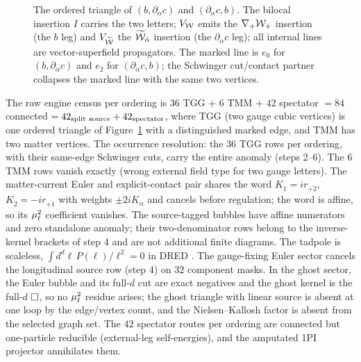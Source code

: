 \begin{figure}[t]
\centering
{}
\caption{The ordered triangle of $(b,\partial_{\dot\alpha}c)$ and
$(\partial_{\dot\alpha}c,b)$. The bilocal insertion $I$ carries the two
letters; $V_{\mathcal{W}}$ emits the $\nabla_{+}\mathcal{W}_{+}$ insertion (the $b$ leg) and
$V_{\widetilde{\mathcal{W}}}$ the $\widetilde{\mathcal{W}}_{\dot\alpha}$ insertion (the
$\partial_{\dot\alpha}c$ leg); all internal lines are vector-superfield
propagators. The marked line is $e_{0}$ for $(b,\partial_{\dot\alpha}c)$ and
$e_{2}$ for $(\partial_{\dot\alpha}c,b)$; the Schwinger cut/contact partner
collapses the marked line with the same two vertices.}
\label{fig:ss:ad-triangle}
\end{figure}

The raw engine census per ordering is $36$ TGG $+$ $6$ TMM $+$ $42$ spectator
$=84$ connected $=42_{\rm split\ source}+42_{\rm spectator}$, where TGG (two
gauge cubic vertices) is one ordered triangle of
Figure~\ref{fig:ss:ad-triangle} with a distinguished marked edge, and TMM has
two matter vertices. The occurrence resolution: the $36$ TGG rows per
ordering, with their same-edge Schwinger cuts, carry the entire anomaly (steps
2--6). The $6$ TMM rows vanish exactly (wrong external field type for two
gauge letters). The matter-current Euler and explicit-contact pair shares the
word $K_{\dot1}=ir_{+\dot2}$, $K_{\dot2}=-ir_{+\dot1}$ with weights
$\pm2iK_{\dot\alpha}$ and cancels before regulation; the word is affine, so
its $\mu_\ell^{2}$ coefficient vanishes. The source-tagged bubbles have affine
numerators and zero standalone anomaly; their two-denominator rows belong to
the inverse-kernel brackets of step 4 and are not additional finite diagrams.
The tadpole is scaleless, $\int d^{d}\ell\,P(\ell)/\ell^{2}=0$ in DRED
\cite{SiegelDRED}. The gauge-fixing Euler sector cancels the longitudinal
source row (step 4) on $32$ component masks. In the ghost sector, the Euler
bubble and its full-$d$ cut are exact negatives and the ghost kernel is the
full-$d$ $\Box$, so no $\mu_\ell^{2}$ residue arises; the ghost triangle with
linear source is absent at one loop by the edge/vertex count, and the
Nielsen--Kallosh factor is absent from the selected graph set. The $42$
spectator routes per ordering are connected but one-particle reducible
(external-leg self-energies), and the amputated 1PI projector annihilates
them.

